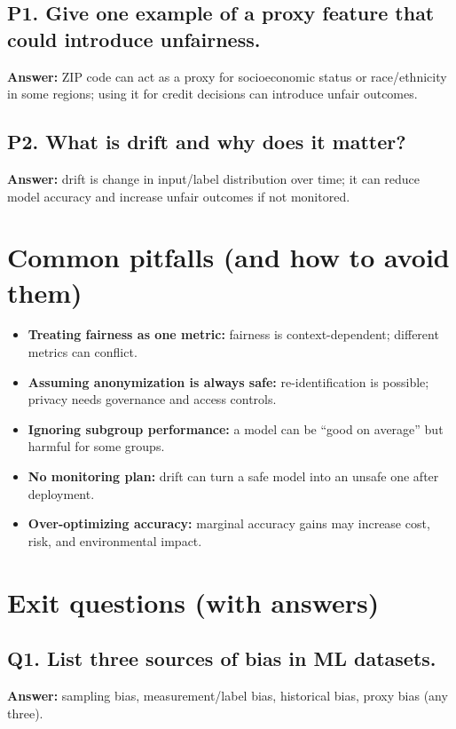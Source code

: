 \documentclass[11pt]{article}
\begin{document}
\subsection*{P1. Give one example of a proxy feature that could introduce unfairness.}
\textbf{Answer:} ZIP code can act as a proxy for socioeconomic status or race/ethnicity in some regions; using it for credit decisions can introduce unfair outcomes.

\subsection*{P2. What is drift and why does it matter?}
\textbf{Answer:} drift is change in input/label distribution over time; it can reduce model accuracy and increase unfair outcomes if not monitored.

\section{Common pitfalls (and how to avoid them)}
\begin{itemize}[leftmargin=*]
  \item \textbf{Treating fairness as one metric:} fairness is context-dependent; different metrics can conflict.
  \item \textbf{Assuming anonymization is always safe:} re-identification is possible; privacy needs governance and access controls.
  \item \textbf{Ignoring subgroup performance:} a model can be ``good on average'' but harmful for some groups.
  \item \textbf{No monitoring plan:} drift can turn a safe model into an unsafe one after deployment.
  \item \textbf{Over-optimizing accuracy:} marginal accuracy gains may increase cost, risk, and environmental impact.
\end{itemize}

\section{Exit questions (with answers)}

\subsection*{Q1. List three sources of bias in ML datasets.}
\textbf{Answer:} sampling bias, measurement/label bias, historical bias, proxy bias (any three).
\end{document}
